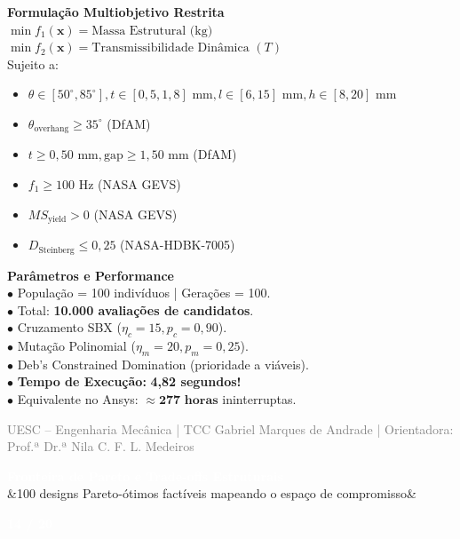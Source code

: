 \documentclass[11pt]{article}
\newcommand{\slideheader}[3]{
    \noindent
    \begin{minipage}{\textwidth}
        \colorbox{SpaceNavy}{
            \parbox{\dimexpr\textwidth-2\fboxsep\relax}{
                \vspace{0.2cm}
                \hspace{0.3cm}
                \begin{minipage}{0.85\textwidth}
                    {\Large \textbf{\textcolor{white}{#1}}}\\[0.1cm]
                    \ifx&#2&\else{\small \textbf{\textcolor{SpaceGold}{#2}}}\fi
                \end{minipage}
                \hfill
                \begin{minipage}{0.10\textwidth}
                    \raggedleft
                    {\large \textbf{\textcolor{white}{#3 / 20}}}\hspace{0.3cm}
                \end{minipage}
                \vspace{0.2cm}
            }
        }
    \end{minipage}
    \vspace{0.4cm}
}
\newcommand{\slidefooter}{
    \vfill
    \noindent
    \begin{minipage}{\textwidth}
        \centering
        \scriptsize \textcolor{gray}{UESC -- Engenharia Mecânica | TCC Gabriel Marques de Andrade | Orientadora: Prof.ª Dr.ª Nila C. F. L. Medeiros}
    \end{minipage}
}
\begin{document}
\begin{minipage}[t]{0.48\textwidth}
    \textbf{\textcolor{NavyAccent}{Formulação Multiobjetivo Restrita}}\\[0.2cm]
    \small
    $\min f_1(\mathbf{x}) = \text{Massa Estrutural (kg)}$\\
    $\min f_2(\mathbf{x}) = \text{Transmissibilidade Dinâmica } (T)$\\[0.2cm]
    Sujeito a:
    \begin{itemize}
        \item $\theta \in [50^\circ, 85^\circ], t \in [0{,}5, 1{,}8]\text{ mm}, l \in [6, 15]\text{ mm}, h \in [8, 20]\text{ mm}$
        \item $\theta_{\text{overhang}} \ge 35^\circ$ (DfAM)
        \item $t \ge 0{,}50\text{ mm}, \text{gap} \ge 1{,}50\text{ mm}$ (DfAM)
        \item $f_1 \ge 100\text{ Hz}$ (NASA GEVS)
        \item $MS_{\text{yield}} > 0$ (NASA GEVS)
        \item $D_{\text{Steinberg}} \le 0{,}25$ (NASA-HDBK-7005)
    \end{itemize}
\end{minipage}
\hfill
\begin{minipage}[t]{0.48\textwidth}
    \textbf{\textcolor{NavyAccent}{Parâmetros e Performance}}\\[0.2cm]
    \small
    $\bullet$ População = 100 indivíduos | Gerações = 100.\\
    $\bullet$ Total: \textbf{10.000 avaliações de candidatos}.\\
    $\bullet$ Cruzamento SBX ($\eta_c=15, p_c=0{,}90$).\\
    $\bullet$ Mutação Polinomial ($\eta_m=20, p_m=0{,}25$).\\
    $\bullet$ Deb's Constrained Domination (prioridade a viáveis).\\
    $\bullet$ \textbf{Tempo de Execução:} \textbf{4,82 segundos!}\\
    $\bullet$ Equivalente no Ansys: $\approx \mathbf{277\text{ horas}}$ ininterruptas.
\end{minipage}

\slidefooter
\clearpage

\slideheader{Fronteira de Pareto e Trade-offs Estruturais}{100 designs Pareto-ótimos factíveis mapeando o espaço de compromisso}{14}
\end{document}
